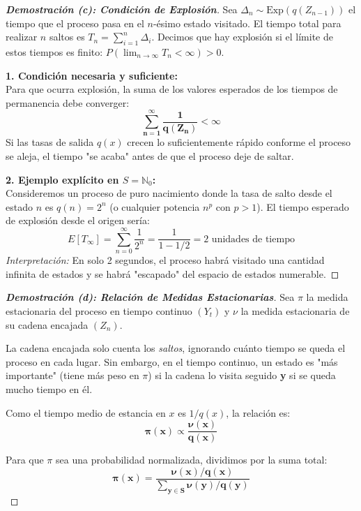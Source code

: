 \documentclass[10pt,a4paper]{article}
\begin{document}
\begin{proof}[\textbf{Demostración (c): Condición de Explosión}]
    Sea $\Delta_n \sim \text{Exp}(q(Z_{n-1}))$ el tiempo que el proceso pasa en el $n$-ésimo estado visitado. El tiempo total para realizar $n$ saltos es $T_n = \sum_{i=1}^n \Delta_i$. 
    Decimos que hay explosión si el límite de estos tiempos es finito: $P(\lim_{n \to \infty} T_n < \infty) > 0$.
    
    \textbf{1. Condición necesaria y suficiente:} \\
    Para que ocurra explosión, la suma de los valores esperados de los tiempos de permanencia debe converger:
    \[ \mathbf{\sum_{n=1}^\infty \frac{1}{q(Z_n)} < \infty} \]
    Si las tasas de salida $q(x)$ crecen lo suficientemente rápido conforme el proceso se aleja, el tiempo "se acaba" antes de que el proceso deje de saltar.

    \textbf{2. Ejemplo explícito en $S = \mathbb{N}_0$:} \\
    Consideremos un proceso de puro nacimiento donde la tasa de salto desde el estado $n$ es $q(n) = 2^n$ (o cualquier potencia $n^p$ con $p > 1$). 
    El tiempo esperado de explosión desde el origen sería:
    \[ E[T_\infty] = \sum_{n=0}^\infty \frac{1}{2^n} = \frac{1}{1 - 1/2} = 2 \text{ unidades de tiempo} \]
    \textit{Interpretación:} En solo 2 segundos, el proceso habrá visitado una cantidad infinita de estados y se habrá "escapado" del espacio de estados numerable.
\end{proof}

\newpage

\begin{proof}[\textbf{Demostración (d): Relación de Medidas Estacionarias}]
    Sea $\pi$ la medida estacionaria del proceso en tiempo continuo $(Y_t)$ y $\nu$ la medida estacionaria de su cadena encajada $(Z_n)$.
    
    La cadena encajada solo cuenta los \textit{saltos}, ignorando cuánto tiempo se queda el proceso en cada lugar. Sin embargo, en el tiempo continuo, un estado es "más importante" (tiene más peso en $\pi$) si la cadena lo visita seguido \textbf{y} si se queda mucho tiempo en él.
    
    Como el tiempo medio de estancia en $x$ es $1/q(x)$, la relación es:
    \[ \mathbf{\pi(x) \propto \frac{\nu(x)}{q(x)}} \]
    
    Para que $\pi$ sea una probabilidad normalizada, dividimos por la suma total:
    \[ \mathbf{\pi(x) = \frac{\nu(x)/q(x)}{\sum_{y \in S} \nu(y)/q(y)}} \]
    
\end{proof}
\end{document}

